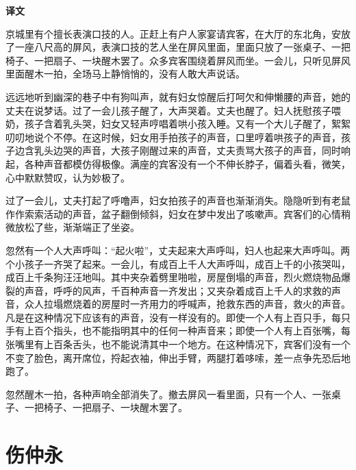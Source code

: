 \documentclass[12pt,UTF-8,openany,a4]{ctexbook}
\begin{document}
\newpage

\begin{Large}
    \noindent\textbf{译文}
\end{Large}


\vspace{1em}

\begin{large}
    \yiwen 
    京城里有个擅长表演口技的人。正赶上有户人家宴请宾客，在大厅的东北角，安放了一座八尺高的屏风，表演口技的艺人坐在屏风里面，里面只放了一张桌子、一把椅子、一把扇子、一块醒木罢了。众多宾客围绕着屏风而坐。一会儿，只听见屏风里面醒木一拍，全场马上静悄悄的，没有人敢大声说话。
    
    远远地听到幽深的巷子中有狗叫声，就有妇女惊醒后打呵欠和伸懒腰的声音，她的丈夫在说梦话。过了一会儿孩子醒了，大声哭着。丈夫也醒了。妇人抚慰孩子喂奶，孩子含着乳头哭，妇女又轻声哼唱着哄小孩入睡。又有一个大儿子醒了，絮絮叨叨地说个不停。在这时候，妇女用手拍孩子的声音，口里哼着哄孩子的声音，孩子边含乳头边哭的声音，大孩子刚醒过来的声音，丈夫责骂大孩子的声音，同时响起，各种声音都模仿得极像。满座的宾客没有一个不伸长脖子，偏着头看，微笑，心中默默赞叹，认为妙极了。
    
    过了一会儿，丈夫打起了呼噜声，妇女拍孩子的声音也渐渐消失。隐隐听到有老鼠作作索索活动的声音，盆子翻倒倾斜，妇女在梦中发出了咳嗽声。宾客们的心情稍微放松了些，渐渐端正了坐姿。
    
    忽然有一个人大声呼叫：“起火啦”，丈夫起来大声呼叫，妇人也起来大声呼叫。两个小孩子一齐哭了起来。一会儿，有成百上千人大声呼叫，成百上千的小孩哭叫，成百上千条狗汪汪地叫。其中夹杂着劈里啪啦，房屋倒塌的声音，烈火燃烧物品爆裂的声音，呼呼的风声，千百种声音一齐发出；又夹杂着成百上千人的求救的声音，众人拉塌燃烧着的房屋时一齐用力的呼喊声，抢救东西的声音，救火的声音。凡是在这种情况下应该有的声音，没有一样没有的。即使一个人有上百只手，每只手有上百个指头，也不能指明其中的任何一种声音来；即使一个人有上百张嘴，每张嘴里有上百条舌头，也不能说清其中一个地方。在这种情况下，宾客们没有一个不变了脸色，离开席位，捋起衣袖，伸出手臂，两腿打着哆嗦，差一点争先恐后地跑了。
    
    忽然醒木一拍，各种声响全部消失了。撤去屏风一看里面，只有一个人、一张桌子、一把椅子、一把扇子、一块醒木罢了。
    
\end{large}



\chapter{伤仲永}
\end{document}
